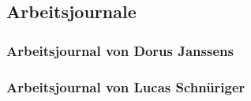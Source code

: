 \subsection{Arbeitsjournale}

\subsubsection{Arbeitsjournal von Dorus Janssens}


\subsubsection{Arbeitsjournal von Lucas Schnüriger}

